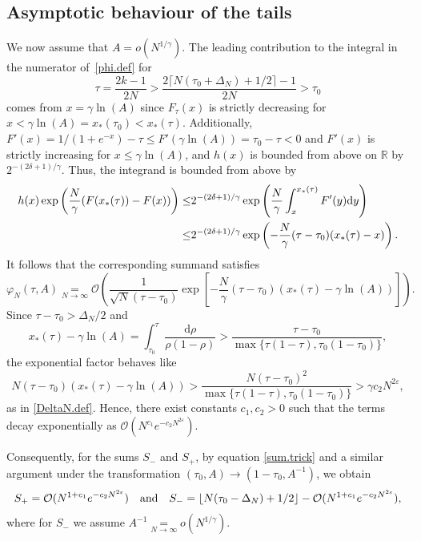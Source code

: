 \documentclass[pdflatex,sn-mathphys-num]{sn-jnl}
\theoremstyle{thmstyleone}
\numberwithin{equation}{section}
\newcommand{\R}{\mathbb{R}}
\begin{document}
\subsection{Asymptotic behaviour of the tails}\label{sec:tails}

We now assume that $A=o(N^{1/\gamma})$. The leading contribution to the integral in the numerator of~\eqref{phi.def} for
\begin{equation}
    \tau=\frac{2k-1}{2N}>\frac{2\lceil N(\tau_0+\Delta_N)+1/2\rceil-1}{2N}>\tau_0
\end{equation}
comes from $x=\gamma\ln(A)$ since $F_\tau(x)$ is strictly decreasing for $x<\gamma\ln(A)=x_*(\tau_0)<x_*(\tau)$. Additionally, $F'(x)=1/(1+e^{-x})-\tau\leq F'(\gamma\ln(A))=\tau_0-\tau<0$ and $F'(x)$ is strictly increasing for $x\leq \gamma\ln(A)$, and $h(x)$ is bounded from above on $\R$ by $2^{-(2\delta+1)/\gamma}$.
Thus, the integrand is bounded from above by
\begin{equation}\label{bound}
\begin{split}
    h(x)\exp\left(\frac{N}{\gamma} (F(x_*(\tau))-F(x))\right)\leq&2^{-(2\delta+1)/\gamma}\exp\left(\frac{N}{\gamma} \int_{x}^{x_*(\tau)}F'(y){\rm d}y\right)\\
    \leq&2^{-(2\delta+1)/\gamma}\exp\left(-\frac{N}{\gamma}(\tau-\tau_0)(x_*(\tau)-x)\right).
\end{split}
\end{equation}
It follows that the corresponding summand satisfies
\begin{equation}
    \varphi_N(\tau,A)\underset{N\to \infty}{=}\mathcal{O}\left(\frac{1}{\sqrt{N}(\tau-\tau_0)}\exp\left[-\frac{N}{\gamma}(\tau-\tau_0)(x_*(\tau)-\gamma\ln(A))\right]\right).
\end{equation}
Since $\tau-\tau_0>\Delta_N/2$ and 
\begin{equation}
x_*(\tau)-\gamma\ln(A)=\int_{\tau_0}^\tau\frac{\mathrm{d}\rho}{\rho(1-\rho)}>\frac{\tau-\tau_0}{\max\{\tau(1-\tau),\tau_0(1-\tau_0)\}},
\end{equation}
the exponential factor behaves like
\begin{equation}
N(\tau-\tau_0)(x_*(\tau)-\gamma\ln(A))>\frac{N(\tau-\tau_0)^2}{\max\{\tau(1-\tau),\tau_0(1-\tau_0)\}}>\gamma c_2 N^{2\varepsilon},
\end{equation}
as in \eqref{DeltaN.def}. Hence, there exist constants $c_1,c_2>0$ such that the terms decay exponentially as $\mathcal{O}(N^{c_1}e^{-c_2 N^{2\varepsilon}})$.


Consequently, for the sums $S_{-}$ and $S_{+}$, by equation \eqref{sum.trick} and a similar argument under the transformation $(\tau_0,A)\to(1-\tau_0,A^{-1})$, we obtain
\begin{equation}\label{Spm.result}
S_+=\mathcal{O}(N^{1+c_1}e^{-c_2 N^{2\varepsilon}}) \quad{\rm and}\quad S_-=\lfloor N(\tau_0-\Delta_N)+1/2\rfloor-\mathcal{O}(N^{1+c_1}e^{-c_2 N^{2\varepsilon}}),
\end{equation}
where for $S_-$ we assume $A^{-1}\underset{N\to\infty}{=}o(N^{1/\gamma})$.
\end{document}
